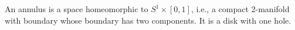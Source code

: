 An annulus is a space homeomorphic to $S^1 \times [0, 1]$, i.e., a compact 2-manifold with boundary whose boundary has two components. It is a disk with one hole.
